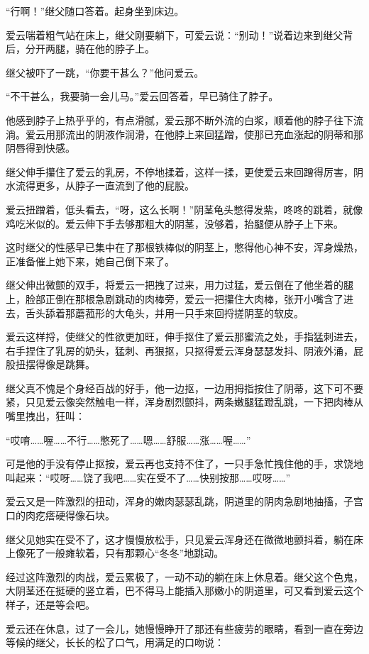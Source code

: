 \documentclass[12pt,UTF8]{ctexbook}
\begin{document}
“行啊！”继父随口答着。起身坐到床边。

爱云喘着粗气站在床上，继父刚要躺下，可爱云说：“别动！”说着边来到继父背后，分开两腿，骑在他的脖子上。

继父被吓了一跳，“你要干甚么？”他问爱云。

“不干甚么，我要骑一会儿马。”爱云回答着，早已骑住了脖子。

他感到脖子上热乎乎的，有点滑腻，爱云那不断外流的白浆，顺着他的脖子往下流淌。爱云用那流出的阴液作润滑，在他脖上来回猛蹭，使那已充血涨起的阴蒂和那阴唇得到快感。

继父伸手攥住了爱云的乳房，不停地揉着，这样一揉，更使爱云来回蹭得厉害，阴水流得更多，从脖子一直流到了他的屁股。

爱云扭蹭着，低头看去，“呀，这么长啊！”阴茎龟头憋得发紫，咚咚的跳着，就像鸡吃米似的。爱云伸下手去够那粗大的阴茎，没够着，抬腿便从脖子上下来。

这时继父的性感早已集中在了那根铁棒似的阴茎上，憋得他心神不安，浑身燥热，正准备催上她下来，她自己倒下来了。

继父伸出微颤的双手，将爱云一把拽了过来，用力过猛，爱云倒在了他坐着的腿上，脸部正倒在那根急剧跳动的肉棒旁，爱云一把攥住大肉棒，张开小嘴含了进去，舌头舔着那蘑菰形的大龟头，并用一只手来回捋搓阴茎的软皮。

爱云这样捋，使继父的性欲更加旺，伸手抠住了爱云那蜜流之处，手指猛刺进去，右手捏住了乳房的奶头，猛刺、再狠抠，只抠得爱云浑身瑟瑟发抖、阴液外涌，屁股扭摆得像是跳舞。

继父真不愧是个身经百战的好手，他一边抠，一边用拇指按住了阴蒂，这下可不要紧，只见爱云像突然触电一样，浑身剧烈颤抖，两条嫩腿猛蹬乱跳，一下把肉棒从嘴里拽出，狂叫：

“哎唷……喔……不行……憋死了……嗯……舒服……涨……喔……”

可是他的手没有停止抠按，爱云再也支持不住了，一只手急忙拽住他的手，求饶地叫起来：“哎呀……饶了我吧……实在受不了……快别按那……哎呀……”

爱云又是一阵激烈的扭动，浑身的嫩肉瑟瑟乱跳，阴道里的阴肉急剧地抽搐，子宫口的肉疙瘩硬得像石块。

继父见她实在受不了，这才慢慢放松手，只见爱云浑身还在微微地颤抖着，躺在床上像死了一般瘫软着，只有那颗心“冬冬”地跳动。

经过这阵激烈的肉战，爱云累极了，一动不动的躺在床上休息着。继父这个色鬼，大阴茎还在挺硬的竖立着，巴不得马上能插入那嫩小的阴道里，可又看到爱云这个样子，还是等会吧。

爱云还在休息，过了一会儿，她慢慢睁开了那还有些疲劳的眼睛，看到一直在旁边等候的继父，长长的松了口气，用满足的口吻说：
\end{document}
